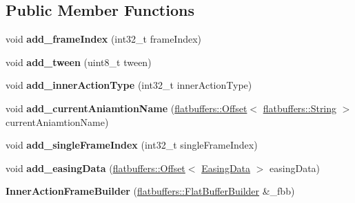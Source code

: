 \subsection*{Public Member Functions}
\begin{DoxyCompactItemize}
\item 
\mbox{\label{structflatbuffers_1_1InnerActionFrameBuilder_ab8e7da79b4d8cca30c1e047ec23178f7}} 
void {\bfseries add\+\_\+frame\+Index} (int32\+\_\+t frame\+Index)
\item 
\mbox{\label{structflatbuffers_1_1InnerActionFrameBuilder_a3a7cec4c31be8d6b9aa3602bd88da08f}} 
void {\bfseries add\+\_\+tween} (uint8\+\_\+t tween)
\item 
\mbox{\label{structflatbuffers_1_1InnerActionFrameBuilder_a25520826a3bda28c4359f63275a7eea8}} 
void {\bfseries add\+\_\+inner\+Action\+Type} (int32\+\_\+t inner\+Action\+Type)
\item 
\mbox{\label{structflatbuffers_1_1InnerActionFrameBuilder_a7d5d455cbc8cc411b8d79089059f7578}} 
void {\bfseries add\+\_\+current\+Aniamtion\+Name} (\hyperlink{structflatbuffers_1_1Offset}{flatbuffers\+::\+Offset}$<$ \hyperlink{structflatbuffers_1_1String}{flatbuffers\+::\+String} $>$ current\+Aniamtion\+Name)
\item 
\mbox{\label{structflatbuffers_1_1InnerActionFrameBuilder_ac563e328f25c2f10dc2f2ee106fc4056}} 
void {\bfseries add\+\_\+single\+Frame\+Index} (int32\+\_\+t single\+Frame\+Index)
\item 
\mbox{\label{structflatbuffers_1_1InnerActionFrameBuilder_a92f290cde86c60b80d5220a61762ca12}} 
void {\bfseries add\+\_\+easing\+Data} (\hyperlink{structflatbuffers_1_1Offset}{flatbuffers\+::\+Offset}$<$ \hyperlink{structflatbuffers_1_1EasingData}{Easing\+Data} $>$ easing\+Data)
\item 
\mbox{\label{structflatbuffers_1_1InnerActionFrameBuilder_a2f161850e4a7219641bb8ca85e0301c0}} 
{\bfseries Inner\+Action\+Frame\+Builder} (\hyperlink{classflatbuffers_1_1FlatBufferBuilder}{flatbuffers\+::\+Flat\+Buffer\+Builder} \&\+\_\+fbb)

\end{DoxyCompactItemize}
